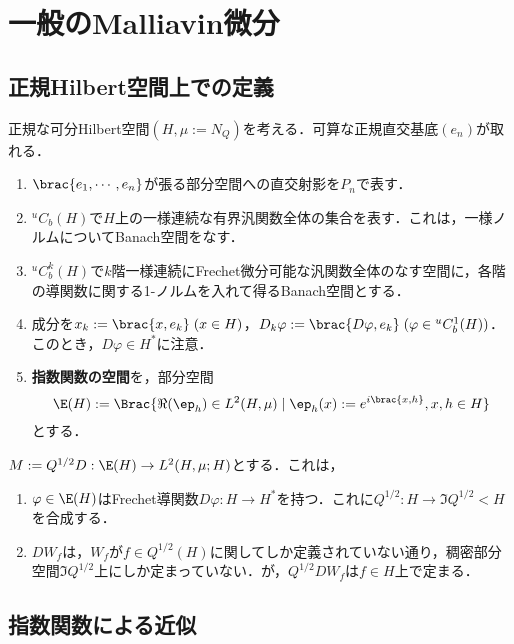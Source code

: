 \documentclass[uplatex,dvipdfmx]{jsreport}
\begin{document}
\section{一般のMalliavin微分}

\subsection{正規Hilbert空間上での定義}

\begin{notation}
    正規な可分Hilbert空間$(H,\mu:=N_Q)$を考える．可算な正規直交基底$(e_n)$が取れる．
    \begin{enumerate}
        \item $\brac{e_1,\cdots,e_n}$が張る部分空間への直交射影を$P_n$で表す．
        \item ${}^uC_b(H)$で$H$上の一様連続な有界汎関数全体の集合を表す．これは，一様ノルムについてBanach空間をなす．
        \item ${}^uC_b^k(H)$で$k$階一様連続にFrechet微分可能な汎関数全体のなす空間に，各階の導関数に関する1-ノルムを入れて得るBanach空間とする．
        \item 成分を$x_k:=\brac{x,e_k}\;(x\in H)$，$D_k\varphi:=\brac{D\varphi,e_k}\;(\varphi\in {}^uC_b^1(H))$．このとき，$D\varphi\in H^*$に注意．
        \item \textbf{指数関数の空間}を，部分空間
        \[\E(H):=\Brac{\Re(\ep_h)\in L^2(H,\mu)\mid \ep_h(x):=e^{i\brac{x,h}},x,h\in H}\]
        とする．
    \end{enumerate}
\end{notation}

\begin{definition}
    $M:=Q^{1/2}D:\E(H)\to L^2(H,\mu;H)$とする．これは，
    \begin{enumerate}
        \item $\varphi\in\E(H)$はFrechet導関数$D\varphi:H\to H^*$を持つ．これに$Q^{1/2}:H\to\Im Q^{1/2}<H$を合成する．
        \item $DW_f$は，$W_f$が$f\in Q^{1/2}(H)$に関してしか定義されていない通り，稠密部分空間$\Im Q^{1/2}$上にしか定まっていない．が，$Q^{1/2}DW_f$は$f\in H$上で定まる．
    \end{enumerate}
\end{definition}

\subsection{指数関数による近似}
\end{document}
